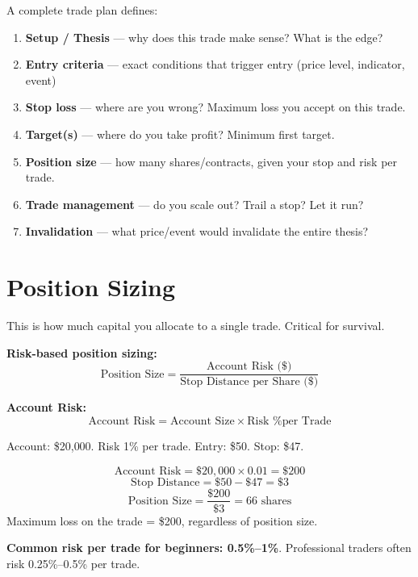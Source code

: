 A complete trade plan defines:
\begin{enumerate}[label=\textbf{\arabic*.}]
  \item \textbf{Setup / Thesis} — why does this trade make sense? What is the edge?
  \item \textbf{Entry criteria} — exact conditions that trigger entry (price level, indicator, event)
  \item \textbf{Stop loss} — where are you wrong? Maximum loss you accept on this trade.
  \item \textbf{Target(s)} — where do you take profit? Minimum first target.
  \item \textbf{Position size} — how many shares/contracts, given your stop and risk per trade.
  \item \textbf{Trade management} — do you scale out? Trail a stop? Let it run?
  \item \textbf{Invalidation} — what price/event would invalidate the entire thesis?
\end{enumerate}

\section{Position Sizing}

This is how much capital you allocate to a single trade. Critical for survival.

\begin{formulabox}
\textbf{Risk-based position sizing:}
\[
  \text{Position Size} = \frac{\text{Account Risk (\$)}}{\text{Stop Distance per Share (\$)}}
\]

\textbf{Account Risk:}
\[
  \text{Account Risk} = \text{Account Size} \times \text{Risk \% per Trade}
\]
\end{formulabox}

\begin{examplebox}
Account: \$20{,}000. Risk 1\% per trade. Entry: \$50. Stop: \$47.

\[
  \text{Account Risk} = \$20{,}000 \times 0.01 = \$200
\]
\[
  \text{Stop Distance} = \$50 - \$47 = \$3
\]
\[
  \text{Position Size} = \frac{\$200}{\$3} = 66 \text{ shares}
\]
Maximum loss on the trade = \$200, regardless of position size.
\end{examplebox}

\textbf{Common risk per trade for beginners: 0.5\%--1\%}. Professional traders often risk
0.25\%--0.5\% per trade.

